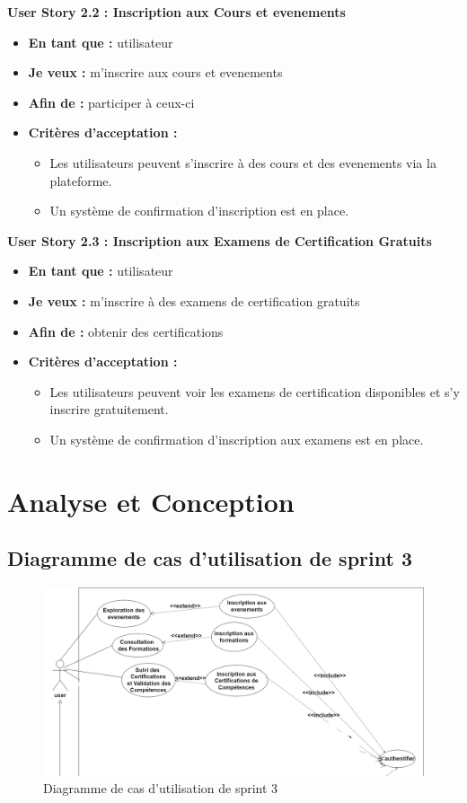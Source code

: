 \documentclass[a4paper, 11pt, openany]{report}
\begin{document}
\textbf{User Story 2.2 : Inscription aux Cours et evenements}
\begin{itemize}
    \item \textbf{En tant que :} utilisateur
    \item \textbf{Je veux :} m'inscrire aux cours et evenements
    \item \textbf{Afin de :} participer à ceux-ci
    \item \textbf{Critères d'acceptation :}
    \begin{itemize}
        \item Les utilisateurs peuvent s'inscrire à des cours et des evenements via la plateforme.
        \item Un système de confirmation d'inscription est en place.
    \end{itemize}
\end{itemize}

\textbf{User Story 2.3 : Inscription aux Examens de Certification Gratuits}
\begin{itemize}
    \item \textbf{En tant que :} utilisateur
    \item \textbf{Je veux :} m'inscrire à des examens de certification gratuits
    \item \textbf{Afin de :} obtenir des certifications
    \item \textbf{Critères d'acceptation :}
    \begin{itemize}
        \item Les utilisateurs peuvent voir les examens de certification disponibles et s'y inscrire gratuitement.
        \item Un système de confirmation d'inscription aux examens est en place.
    \end{itemize}
\end{itemize}


\section{Analyse et Conception}
\subsection{Diagramme de cas d'utilisation de sprint 3}

\begin{figure}[H]
\centering
\includegraphics[width=\textwidth]{assets/images/sprint3-usecase.png} 
\caption{Diagramme de cas d'utilisation de sprint 3}
\label{fig:s3-use}
\end{figure}
\end{document}
